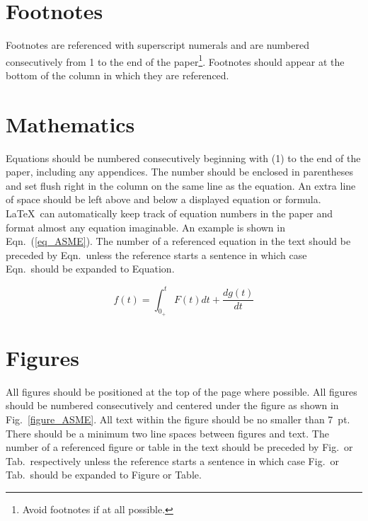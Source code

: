 \documentclass[twocolumn,10pt]{asme2ej}
\begin{document}
\section{Footnotes\protect\footnotemark}

Footnotes are referenced with superscript numerals and are numbered consecutively from 1 to the end of the paper\footnote{Avoid footnotes if at all possible.}. Footnotes should appear at the bottom of the column in which they are referenced.


\section{Mathematics}

Equations should be numbered consecutively beginning with (1) to the end of the paper, including any appendices.  The number should be enclosed in parentheses and set flush right in the column on the same line as the equation.  An extra line of space should be left above and below a displayed equation or formula. \LaTeX\ can automatically keep track of equation numbers in the paper and format almost any equation imaginable. An example is shown in Eqn.~(\ref{eq_ASME}). The number of a referenced equation in the text should be preceded by Eqn.\ unless the reference starts a sentence in which case Eqn.\ should be expanded to Equation.

\begin{equation}
f(t) = \int_{0_+}^t F(t) dt + \frac{d g(t)}{d t}
\label{eq_ASME}
\end{equation}

\section{Figures}
\label{sect_figure}

All figures should be positioned at the top of the page where possible.  All figures should be numbered consecutively and centered under the figure as shown in Fig.~\ref{figure_ASME}. All text within the figure should be no smaller than 7~pt. There should be a minimum two line spaces between figures and text. The number of a referenced figure or table in the text should be preceded by Fig.\ or Tab.\ respectively unless the reference starts a sentence in which case Fig.\ or Tab.\ should be expanded to Figure or Table.
\end{document}
